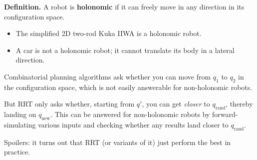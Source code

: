 \textbf{Definition.}
A robot is \textbf{holonomic} if
it can freely move in any direction in its configuration space.
\begin{itemize}
    \item The simplified 2D two-rod Kuka IIWA
    is a holonomic robot.
    \item A car is not a holonomic robot;
    it cannot translate its body in a lateral direction.
\end{itemize}

Combinatorial planning algorithms
ask whether you can move from $q_1$ to $q_2$
in the configuration space,
which is not easily answerable for
non-holonomic robots.

But RRT only asks whether, starting from $q'$,
you can get \emph{closer} to $q_{\mathrm{rand}}$,
thereby landing on $q_{\mathrm{new}}$.
This can be answered for non-holonomic robots
by forward-simulating various inputs
and checking whether any results
land closer to $q_{\mathrm{rand}}$.

Spoilers: it turns out that RRT (or variants of it)
just perform the best in practice.

